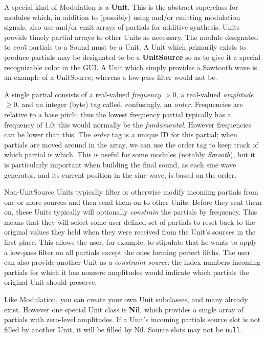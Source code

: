 \documentclass{article}
\begin{document}
A special kind of Modulation is a {\bf Unit}.  This is the abstract superclass for modules which, in addition to (possibly) using and/or emitting modulation signals, also use and/or emit arrays of partials for additive synthesis.  Units provide timely partial arrays to other Units as necessary.  The module designated to {\it emit} partials to a Sound must be a Unit.  A Unit which primarily exists to produce partials may be designated to be a {\bf UnitSource} so as to give it a special recognizable color in the GUI.  A Unit which simply provides a Sawtooth wave is an example of a UnitSource; whereas a low-pass filter would not be.

A single partial consists of a real-valued {\it frequency} \(> 0\), a real-valued {\it amplitude} \(\geq 0\), and an integer (byte) tag called, confusingly, an {\it order}.  Frequencies are relative to a base pitch: thus the lowest frequency partial typically has a frequency of 1.0: this would normally be the {\it fundamental}.   However frequencies can be lower than this.  The {\it order} tag is a unique ID for this partial; when partials are moved around in the array, we can use the order tag to keep track of which partial is which. This is useful for some modules (notably {\it Smooth}), but it is particularly important when building the final sound, as each sine wave generator, and its current position in the sine wave, is based on the order.

Non-UnitSource Units typically filter or otherwise modify incoming partials from one or more sources and then send them on to other Units.  Before they sent them on, these Units typically will optionally {\it constrain} the partials by frequency.  This means that they will select some user-defined set of partials to reset back to the original values they held when they were received from the Unit's sources in the first place.  This allows the user, for example, to stipulate that he wants to apply a low-pass filter on all partials except the ones forming perfect fifths.  The user can also provide another Unit as a {\it constraint source}: the index numbers incoming partials for which it has nonzero amplitudes would indicate which partials the original Unit should preserve. 

Like Modulation, you can create your own Unit subclasses, and many already exist.  However one special Unit class is {\bf Nil}, which provides a single array of partials with zero-level amplitudes.  If a Unit's incoming partials source slot is not filled by another Unit, it will be filled by Nil. Source slots may not be {\tt null}.
\end{document}
